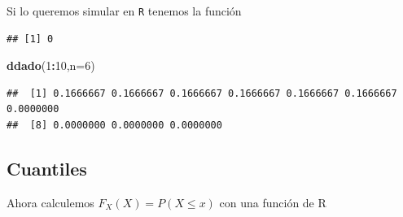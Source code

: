 \documentclass[]{book}
\newenvironment{Shaded}{\begin{snugshade}}{\end{snugshade}}
\newcommand{\ControlFlowTok}[1]{\textcolor[rgb]{0.13,0.29,0.53}{\textbf{#1}}}
\newcommand{\DataTypeTok}[1]{\textcolor[rgb]{0.13,0.29,0.53}{#1}}
\newcommand{\DecValTok}[1]{\textcolor[rgb]{0.00,0.00,0.81}{#1}}
\newcommand{\FloatTok}[1]{\textcolor[rgb]{0.00,0.00,0.81}{#1}}
\newcommand{\KeywordTok}[1]{\textcolor[rgb]{0.13,0.29,0.53}{\textbf{#1}}}
\newcommand{\NormalTok}[1]{#1}
\newcommand{\OperatorTok}[1]{\textcolor[rgb]{0.81,0.36,0.00}{\textbf{#1}}}
\newcommand{\StringTok}[1]{\textcolor[rgb]{0.31,0.60,0.02}{#1}}
\begin{document}
Si lo queremos simular en \texttt{R} tenemos la función

\begin{Shaded}
\end{Shaded}

\begin{verbatim}
## [1] 0
\end{verbatim}

\begin{Shaded}
\begin{Highlighting}[]
\KeywordTok{ddado}\NormalTok{(}\DecValTok{1}\OperatorTok{:}\DecValTok{10}\NormalTok{,}\DataTypeTok{n=}\DecValTok{6}\NormalTok{)}
\end{Highlighting}
\end{Shaded}

\begin{verbatim}
##  [1] 0.1666667 0.1666667 0.1666667 0.1666667 0.1666667 0.1666667 0.0000000
##  [8] 0.0000000 0.0000000 0.0000000
\end{verbatim}

\hypertarget{cuantiles-6}{%
\subsection{Cuantiles}\label{cuantiles-6}}

Ahora calculemos \(F_X(X)=P(X\leq x)\) con una función de R
\end{document}
